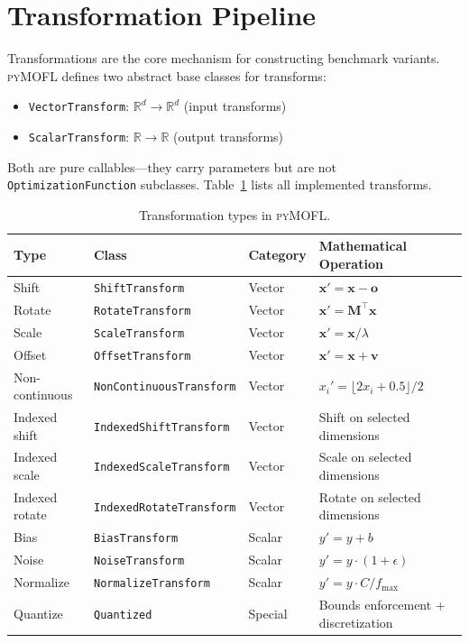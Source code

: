 \documentclass[11pt,a4paper]{article}
\newcommand{\pymofl}{\textsc{pyMOFL}}
\newcommand{\R}{\mathbb{R}}
\begin{document}
\section{Transformation Pipeline}\label{sec:transforms}

Transformations are the core mechanism for constructing benchmark variants.
\pymofl{} defines two abstract base classes for transforms:

\begin{itemize}[nosep]
  \item \texttt{VectorTransform}: $\R^d \to \R^d$ (input transforms)
  \item \texttt{ScalarTransform}: $\R \to \R$ (output transforms)
\end{itemize}

Both are pure callables---they carry parameters but are not
\texttt{OptimizationFunction} subclasses. Table~\ref{tab:transforms} lists all
implemented transforms.

\begin{table}[t]
\centering
\caption{Transformation types in \pymofl{}.}
\label{tab:transforms}
\small
\begin{tabular}{@{}llll@{}}
\toprule
\textbf{Type} & \textbf{Class} & \textbf{Category} & \textbf{Mathematical Operation} \\
\midrule
Shift     & \texttt{ShiftTransform}     & Vector & $\mathbf{x}' = \mathbf{x} - \mathbf{o}$ \\
Rotate    & \texttt{RotateTransform}    & Vector & $\mathbf{x}' = \mathbf{M}^\top \mathbf{x}$ \\
Scale     & \texttt{ScaleTransform}     & Vector & $\mathbf{x}' = \mathbf{x} / \lambda$ \\
Offset    & \texttt{OffsetTransform}    & Vector & $\mathbf{x}' = \mathbf{x} + \mathbf{v}$ \\
Non-continuous & \texttt{NonContinuousTransform} & Vector & $x_i' = \lfloor 2x_i + 0.5 \rfloor / 2$ \\
Indexed shift  & \texttt{IndexedShiftTransform}  & Vector & Shift on selected dimensions \\
Indexed scale  & \texttt{IndexedScaleTransform}  & Vector & Scale on selected dimensions \\
Indexed rotate & \texttt{IndexedRotateTransform} & Vector & Rotate on selected dimensions \\
\midrule
Bias      & \texttt{BiasTransform}      & Scalar & $y' = y + b$ \\
Noise     & \texttt{NoiseTransform}     & Scalar & $y' = y \cdot (1 + \epsilon)$ \\
Normalize & \texttt{NormalizeTransform}  & Scalar & $y' = y \cdot C / f_{\max}$ \\
Quantize  & \texttt{Quantized}          & Special & Bounds enforcement + discretization \\
\bottomrule
\end{tabular}
\end{table}
\end{document}
